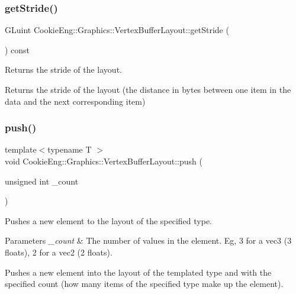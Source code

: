 \subsubsection{get\+Stride()}
{\footnotesize\ttfamily G\+Luint Cookie\+Eng\+::\+Graphics\+::\+Vertex\+Buffer\+Layout\+::get\+Stride (\begin{DoxyParamCaption}{ }\end{DoxyParamCaption}) const\hspace{0.3cm}{\ttfamily [inline]}}



Returns the stride of the layout. 

Returns the stride of the layout (the distance in bytes between one item in the data and the next corresponding item) \mbox{\label{class_cookie_eng_1_1_graphics_1_1_vertex_buffer_layout_a8d9958c85411d75d7f412b2d3f7b566a}} 
\subsubsection{push()\hspace{0.1cm}{\footnotesize\ttfamily [1/4]}}
{\footnotesize\ttfamily template$<$typename T $>$ \\
void Cookie\+Eng\+::\+Graphics\+::\+Vertex\+Buffer\+Layout\+::push (\begin{DoxyParamCaption}\item[{unsigned int}]{\+\_\+count }\end{DoxyParamCaption})\hspace{0.3cm}{\ttfamily [inline]}}



Pushes a new element to the layout of the specified type. 


\begin{DoxyParams}{Parameters}
{\em \+\_\+count} & The number of values in the element. Eg, 3 for a vec3 (3 floats), 2 for a vec2 (2 floats).\\
\hline
\end{DoxyParams}
Pushes a new element into the layout of the templated type and with the specified count (how many items of the specified type make up the element). \mbox{\label{class_cookie_eng_1_1_graphics_1_1_vertex_buffer_layout_a3f1a639714762ec45edf48a68995d7bd}} 
